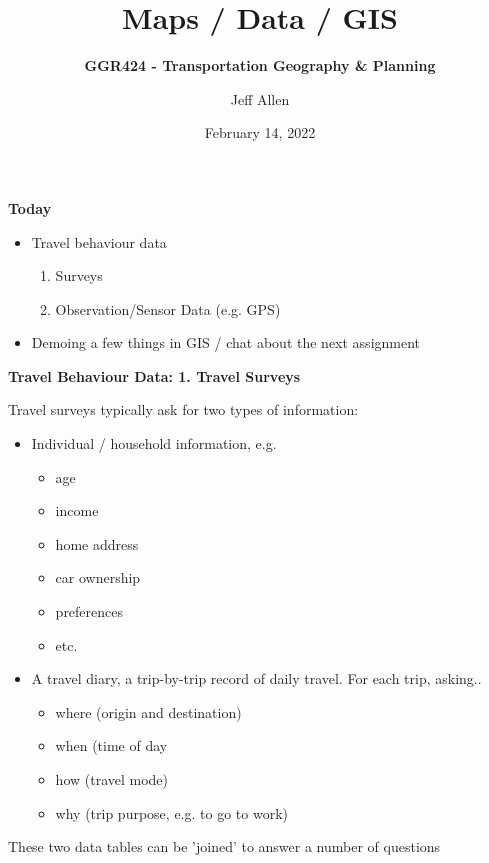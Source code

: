 \documentclass[aspectratio=169]{beamer}
\title{\textbf{Maps / Data / GIS}}
\subtitle{\textbf{GGR424 - Transportation Geography \& Planning}}
\author{Jeff Allen}
\institute{University of Toronto}
\date{February 14, 2022}
\begin{document}
	
\begin{frame}
	\titlepage	
\end{frame}






\begin{frame}
	
	\textbf{Today}
	
	
	\begin{itemize}
		
		\item Travel behaviour data
		\begin{enumerate}
			\item Surveys
			\item Observation/Sensor Data (e.g. GPS)
		\end{enumerate}
		\item Demoing a few things in GIS / chat about the next assignment
		
	\end{itemize}
	
	
\end{frame}




\begin{frame}
	
	\textbf{Travel Behaviour Data: 1. Travel Surveys}
	
	\vspace{2mm}
	
	Travel surveys typically ask for two types of information:
	
	\begin{itemize}
		\item Individual / household information, e.g. 
		\begin{itemize}
			\item age
			\item income
			\item home address
			\item car ownership
			\item preferences
			\item etc.
		\end{itemize}
		
		\item A travel diary, a trip-by-trip record of daily travel. For each trip, asking..
		\begin{itemize}
			\item where (origin and destination)
			\item when (time of day
			\item how (travel mode)
			\item why (trip purpose, e.g. to go to work)
		\end{itemize}
	\end{itemize}

	These two data tables can be 'joined' to answer a number of questions

\end{frame}
\end{document}
